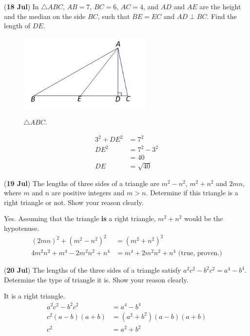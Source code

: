 \documentclass[12pt,answers]{exam}
\newcommand{\qndate}[2]{(\textbf{#1 #2})}
\begin{document}
\begin{questions}
  \question \qndate{18}{Jul} In $\triangle ABC$, $AB=7$, $BC=6$, $AC=4$, and
  $AD$ and $AE$ are the height and the median on the side $BC$, such
  that $BE=EC$
  and $AD\perp BC$. Find the length of $DE$.
  \begin{figure}[htpb]
    \centering
    \includegraphics[scale=.7]{images/0718_Tri.jpeg}
    \label{fig:0718_Tri}
    \caption{$\triangle ABC$.}
  \end{figure}
  \begin{solution}
    \begin{align*}
      3^2 + {DE}^2 & = 7^2       \\
      {DE}^2       & = 7^2 - 3^2 \\
      & = 40        \\
      {DE}         & = \sqrt{40}
    \end{align*}
  \end{solution}

  \question \qndate{19}{Jul} The lengths of three sides of a triangle
  are $m^2-n^2$,
  $m^2+n^2$ and $2mn$, where $m$ and $n$ are positive integers and
  $m>n$. Determine
  if this triangle is a right triangle or not. Show your reason clearly.
  \begin{solution}
    Yes. Assuming that the triangle \textbf{is} a right triangle,
    $m^2+n^2$ would be the hypotenuse.
    \begin{align*}
      {\left(2mn\right)}^2 + {\left(m^2 - n^2\right)}^2 & =
      {\left(m^2+n^2\right)}^2                    \\
      4m^2n^2 + m^4 - 2m^2n^2 + n^4                     & = m^4 +
      2m^2n^2 + n^4 \text{ (true, proven.)}
    \end{align*}
  \end{solution}

  \question \qndate{20}{Jul} The lengths of the three sides of a
  triangle satisfy
  $a^2c^2 - b^2c^2 = a^4-b^4$. Determine the type of triangle it is.
  Show your reason
  clearly.
  \begin{solution}
    It is a right triangle.
    \begin{align*}
      a^2c^2 - b^2c^2                     & = a^4-b^4
      \\
      c^2\left(a-b\right)\left(a+b\right) & =
      \left(a^2+b^2\right)\left(a-b\right)\left(a+b\right) \\
      c^2                                 & = a^2 + b^2
    \end{align*}
  \end{solution}


\end{questions}
\end{document}
